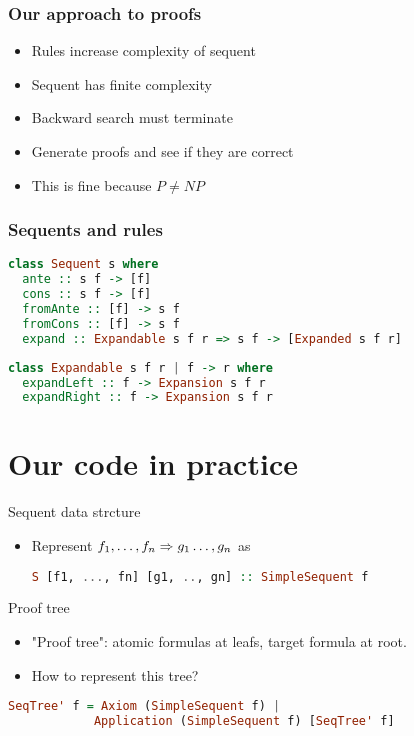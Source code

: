 \documentclass{beamer}
\begin{document}
\begin{frame}
    \frametitle{Our approach to proofs}

    \begin{itemize}
        \item Rules increase complexity of sequent
        \item Sequent has finite complexity
        \item Backward search must terminate
        \item Generate proofs and see if they are correct
        \item This is fine because \(P\neq NP\)
    \end{itemize}

\end{frame}

\begin{frame}[fragile]
    \frametitle{Sequents and rules}

    \begin{lstlisting}[language=Haskell]
class Sequent s where
  ante :: s f -> [f]
  cons :: s f -> [f]
  fromAnte :: [f] -> s f
  fromCons :: [f] -> s f
  expand :: Expandable s f r => s f -> [Expanded s f r]
    \end{lstlisting}

    \begin{lstlisting}[language=Haskell]
class Expandable s f r | f -> r where
  expandLeft :: f -> Expansion s f r
  expandRight :: f -> Expansion s f r
    \end{lstlisting}
\end{frame}

\section{Our code in practice}

\begin{frame}[fragile]{Sequent data strcture}
    \begin{itemize}
        \item Represent $f_1, \ldots, f_n\Rightarrow g_1 \ldots, g_n$ as
        \vspace{1em}
   	\begin{lstlisting}[language=
    Haskell]
S [f1, ..., fn] [g1, .., gn] :: SimpleSequent f
    \end{lstlisting}
    \end{itemize}
\end{frame}

\begin{frame}[fragile]{Proof tree}
\begin{itemize}
	\item "Proof tree": atomic formulas at leafs, target formula at root.
	\item How to represent this tree?
\end{itemize}
\pause

	\vspace{1em}
	\begin{lstlisting}[language=haskell]
SeqTree' f = Axiom (SimpleSequent f) |
            Application (SimpleSequent f) [SeqTree' f]
\end{lstlisting}
\end{frame}
\end{document}
